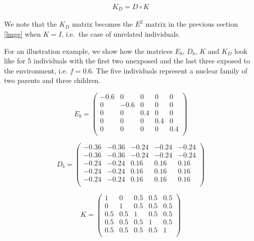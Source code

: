 \documentclass[]{book}
\begin{document}
\begin{equation}
\begin{split}
K_{D} =  D \circ K
\end{split}
\label{eq:kd}
\end{equation}

We note that the \(K_{D}\) matrix becomes the \(E^2\) matrix in the
previous section \ref{lmge} when \(K = I\), i.e.~the case of unrelated
individuals.

For an illustration example, we show how the matrices \(E_b\), \(D_b\),
\(K\) and \(K_{D}\) look like for 5 individuals with the first two
unexposed and the last three exposed to the environment, i.e.
\(f = 0.6\). The five individuals represent a nuclear family of two
parents and three children.

\begin{equation*} 
E_b = 
\left(\begin{array}{ccccc}
-0.6 & 0 & 0 & 0 & 0\\
0 & -0.6 & 0 & 0 & 0\\
0 & 0 & 0.4 & 0 & 0\\
0 & 0 & 0 & 0.4 & 0\\
0 & 0 & 0 & 0 & 0.4\\
\end{array}\right)
\end{equation*}

\begin{equation*} 
D_b = 
\left(\begin{array}{ccccc}
-0.36 & -0.36 & -0.24 & -0.24 & -0.24\\
-0.36 & -0.36 & -0.24 & -0.24 & -0.24\\
-0.24 & -0.24 & 0.16 & 0.16 & 0.16\\
-0.24 & -0.24 & 0.16 & 0.16 & 0.16\\
-0.24 & -0.24 & 0.16 & 0.16 & 0.16\\
\end{array}\right)
\end{equation*}

\begin{equation*} 
K = 
\left(\begin{array}{ccccc}
1 & 0 & 0.5 & 0.5 & 0.5\\
0 & 1 & 0.5 & 0.5 & 0.5\\
0.5 & 0.5 & 1 & 0.5 & 0.5\\
0.5 & 0.5 & 0.5 & 1 & 0.5\\
0.5 & 0.5 & 0.5 & 0.5 & 1\\
\end{array}\right)
\end{equation*}
\end{document}
